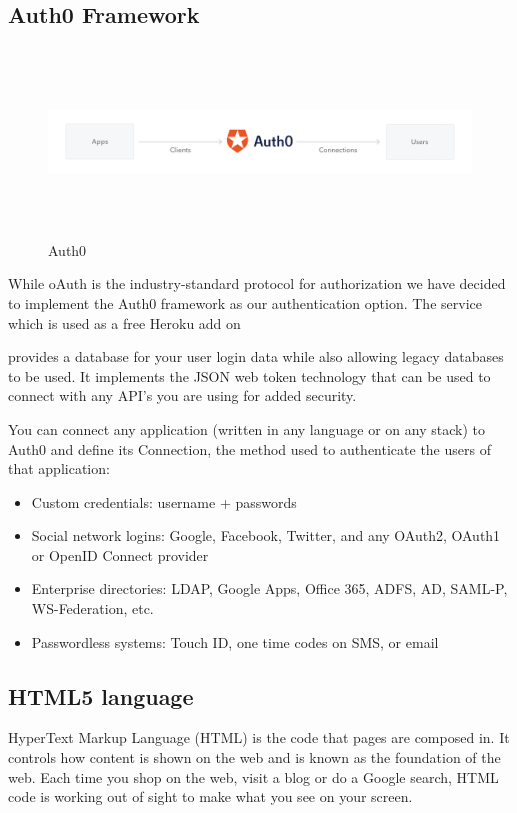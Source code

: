 \subsection{Auth0 Framework}
\begin{figure}
      \caption{Auth0 \cite{auth0}}
      \centering
      \includegraphics[width=13.5cm, height=5cm]{img/auth0.png}
\end{figure}
While oAuth is the industry-standard protocol for authorization we have decided to implement the Auth0 framework as our authentication option. The service which is used as a free Heroku add on

provides a database for your user login data while also allowing legacy databases to be used. It implements the JSON web token technology that can be used to connect with any API's you are using for added security.



You can connect any application (written in any language or on any stack) to Auth0 and define its Connection, the method used to authenticate the users of that application:\cite{auth0}
\begin{itemize}
\item Custom credentials: username + passwords \cite{auth0}
\item Social network logins: Google, Facebook, Twitter, and any OAuth2,  OAuth1 or OpenID Connect provider \cite{auth0}
\item Enterprise directories: LDAP, Google Apps, Office 365, ADFS, AD, SAML-P, WS-Federation, etc. \cite{auth0}
\item Passwordless systems: Touch ID, one time codes on SMS, or email \cite{auth0}
\end{itemize}

\subsection{HTML5 language}
HyperText Markup Language (HTML) is the code that pages are composed in.\cite{html2} It controls how content is shown on the web and is known as the foundation of the web. Each time you shop on the web, visit a blog or do a Google search, HTML code is working out of sight to make what you see on your screen.\cite{html2}


